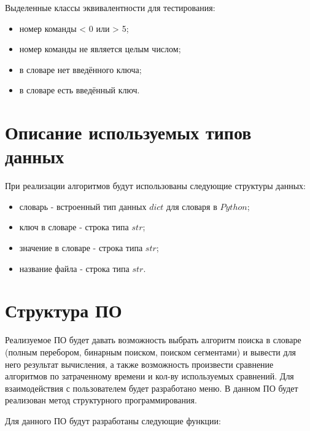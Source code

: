 \documentclass[a4paper,14pt, unknownkeysallowed]{extreport}
\begin{document}
Выделенные классы эквивалентности для тестирования:

\begin{itemize}
	\item номер команды < 0 или > 5;
	\item номер команды не является целым числом;
	\item в словаре нет введённого ключа;
	\item в словаре есть введённый ключ.
\end{itemize}

\section{Описание используемых типов данных}

При реализации алгоритмов будут использованы следующие структуры данных:

\begin{itemize}
	\item словарь - встроенный тип данных $dict$ для словаря в $Python$;
	\item ключ в словаре - строка типа $str$;
	\item значение в словаре - строка типа $str$;
	\item название файла - строка типа $str$.
\end{itemize}


\section{Структура ПО}

Реализуемое ПО будет давать возможность выбрать алгоритм поиска в словаре (полным перебором, бинарным поиском, поиском сегментами) и вывести для него результат вычисления, а также возможность произвести сравнение алгоритмов по затраченному времени и кол-ву используемых сравнений. Для взаимодействия с пользователем будет разработано меню. В данном ПО будет реализован метод структурного программирования. \newline

Для данного ПО будут разработаны следующие функции:
\end{document}
